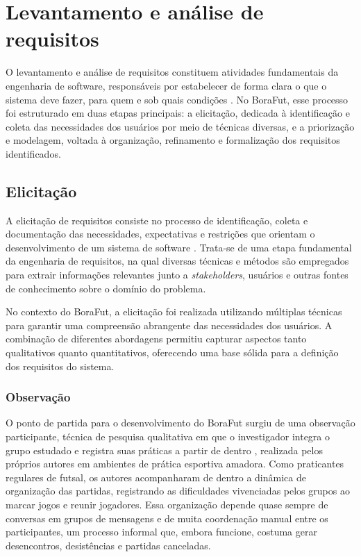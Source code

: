 \section{Levantamento e análise de requisitos}
    \label{sec:metodologia-elicitacao}

        O levantamento e análise de requisitos constituem atividades fundamentais da engenharia de software, responsáveis por estabelecer de forma clara o que o sistema deve fazer, para quem e sob quais condições \cite{pressman2019, sommerville2011}. No BoraFut, esse processo foi estruturado em duas etapas principais: a elicitação, dedicada à identificação e coleta das necessidades dos usuários por meio de técnicas diversas, e a priorização e modelagem, voltada à organização, refinamento e formalização dos requisitos identificados.

    \subsection{Elicitação}

        A elicitação de requisitos consiste no processo de identificação, coleta e documentação das necessidades, expectativas e restrições que orientam o desenvolvimento de um sistema de software \cite{pressman2019, sommerville2011}. Trata-se de uma etapa fundamental da engenharia de requisitos, na qual diversas técnicas e métodos são empregados para extrair informações relevantes junto a \textit{stakeholders}, usuários e outras fontes de conhecimento sobre o domínio do problema.

        No contexto do BoraFut, a elicitação foi realizada utilizando múltiplas técnicas para garantir uma compreensão abrangente das necessidades dos usuários. A combinação de diferentes abordagens permitiu capturar aspectos tanto qualitativos quanto quantitativos, oferecendo uma base sólida para a definição dos requisitos do sistema.

        \subsubsection{Observação}

            O ponto de partida para o desenvolvimento do BoraFut surgiu de uma observação participante, técnica de pesquisa qualitativa em que o investigador integra o grupo estudado e registra suas práticas a partir de dentro \cite{gil2008}, realizada pelos próprios autores em ambientes de prática esportiva amadora. Como praticantes regulares de futsal, os autores acompanharam de dentro a dinâmica de organização das partidas, registrando as dificuldades vivenciadas pelos grupos ao marcar jogos e reunir jogadores. Essa organização depende quase sempre de conversas em grupos de mensagens e de muita coordenação manual entre os participantes, um processo informal que, embora funcione, costuma gerar desencontros, desistências e partidas canceladas.

